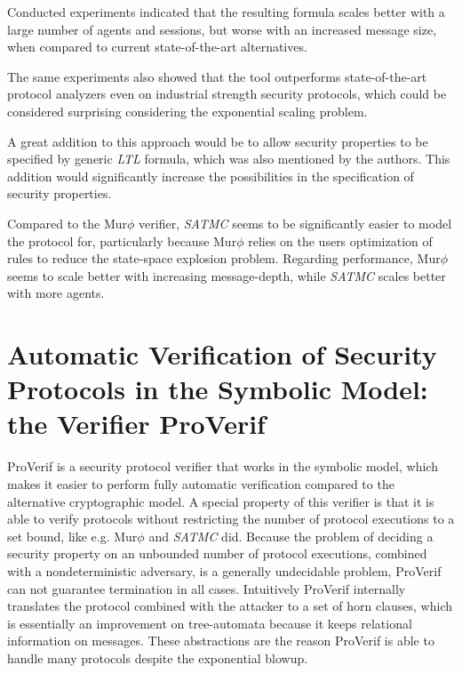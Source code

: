 \documentclass[a4paper,UKenglish]{lipics-v2018}
\def\murphi{Mur$\phi$ }
\begin{document}
Conducted experiments indicated that the resulting formula scales better with a large number of agents and sessions, but worse with an increased message size, when compared to current state-of-the-art alternatives.
\cite{sat}


The same experiments also showed that the tool outperforms state-of-the-art protocol analyzers even on industrial strength security protocols, which could be considered surprising considering the exponential scaling problem.
\cite{sat}

A great addition to this approach would be to allow security properties to be specified by generic \textit{LTL} formula, which was also mentioned by the authors. This addition would significantly increase the possibilities in the specification of security properties.

Compared to the \murphi verifier, \textit{SATMC} seems to be significantly easier to model the protocol for, particularly because \murphi relies on the users optimization of rules to reduce the state-space explosion problem. Regarding performance, \murphi seems to scale better with increasing message-depth, while \textit{SATMC} scales better with more agents.



\section{Automatic Verification of Security Protocols in the Symbolic Model: the Verifier ProVerif}

ProVerif is a security protocol verifier that works in the symbolic model, which makes it easier to perform fully automatic verification compared to the alternative cryptographic model. 
A special property of this verifier is that it is able to verify protocols without restricting the number of protocol executions to a set bound, like e.g. \murphi \cite{murphi} and \textit{SATMC}\cite{sat} did. Because the problem of deciding a security property on an unbounded number of protocol executions, combined with a nondeterministic adversary, is a generally undecidable problem, ProVerif can not guarantee termination in all cases. Intuitively ProVerif internally translates the protocol combined with the attacker to a set of horn clauses, which is essentially an improvement on tree-automata because it keeps relational information on messages. These abstractions are the reason ProVerif is able to handle many protocols despite the exponential blowup.\cite{ProVerif}
\end{document}
